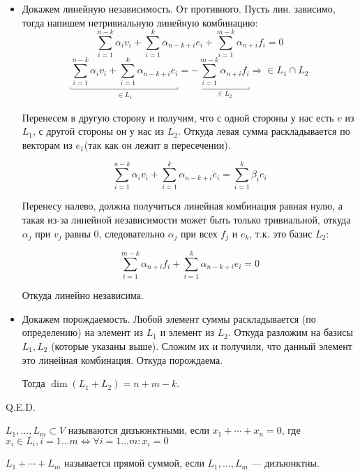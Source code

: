 \begin{enumerate}
          \begin{itemize}
              \item Докажем линейную независимость. От противного. Пусть лин. зависимо, тогда напишем нетривиальную линейную комбинацию:
                    $$\sum\limits_{i=1}^{n-k} \alpha_i v_i + \sum\limits_{i=1}^{k}\alpha_{n-k+i}e_i +\sum\limits_{i=1}^{m-k}\alpha_{n+i}f_i =0$$
                    $$\underbracket{\sum\limits_{i=1}^{n-k} \alpha_i v_i + \sum\limits_{i=1}^{k}\alpha_{n-k+i}e_i}_{\substack{\in L_1}} =-\underbracket{\sum\limits_{i=1}^{m-k}\alpha_{n+i}f_i}_{\in L_2} \Rightarrow \in L_1 \cap L_2$$

                    Перенесем в другую сторону и получим, что с одной стороны у нас есть $v$ из $L_1$, с другой стороны он у нас из $L_2$. Откуда левая сумма раскладывается по векторам из $e_1$(так как он лежит в пересечении).

                    $$\sum\limits_{i=1}^{n-k} \alpha_i v_i + \sum\limits_{i=1}^{k}\alpha_{n-k+i}e_i = \sum\limits_{i=1}^{k}\beta_{i}e_i$$

                    Перенесу налево, должна получиться линейная комбинация равная нулю, а такая из-за линейной независимости может быть только тривиальной, откуда $\alpha_j$ при $v_j$ равны 0, следовательно $\alpha_j$ при всех $f_j$ и $e_k$, т.к. это базис $L_2$:

                    $$\sum_{i=1}^{m-k}\alpha_{n+i}f_i + \sum_{i=1}^k \alpha_{n-k+i}e_i = 0$$
                    
                    Откуда линейно независима.
              \item Докажем порождаемость. Любой элемент суммы раскладывается (по определению) на элемент из $L_1$ и элемент из $L_2$. Откуда разложим на базисы $L_1,L_2$ (которые указаны выше). Сложим их и получили, что данный элемент это линейная комбинация. Откуда порождаема.

              Тогда $\dim(L_1 + L_2) = n + m - k$.
          \end{itemize}

\end{enumerate}

\hfill Q.E.D.

\(L_1, \ldots, L_m \subset V\) называются дизъюнктными, если \(x_1 + \cdots + x_n = 0\), где \(x_i \in L_i, i = 1 \ldots m \Leftrightarrow \forall i = 1 \ldots m: x_i = 0\)

\(L_1 + \cdots + L_m\) называется прямой суммой, если \(L_1, \ldots, L_m\) --- дизъюнктны.

